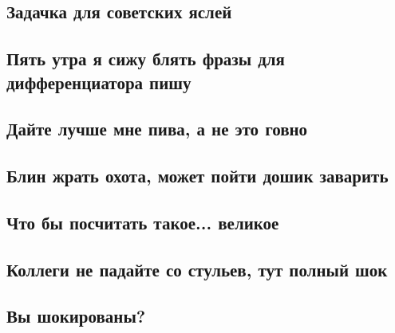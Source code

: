 \documentclass[12pt]{article}
\begin{document}
\subsection{Задачка для советских яслей}
\subsection{Пять утра я сижу блять фразы для дифференциатора пишу}
\subsection{Дайте лучше мне пива, а не это говно}
\subsection{Блин жрать охота, может пойти дошик заварить}
\subsection{Что бы посчитать такое... великое}
\subsection{Коллеги не падайте со стульев, тут полный шок}
\subsection{Вы шокированы?}
\end{document}
